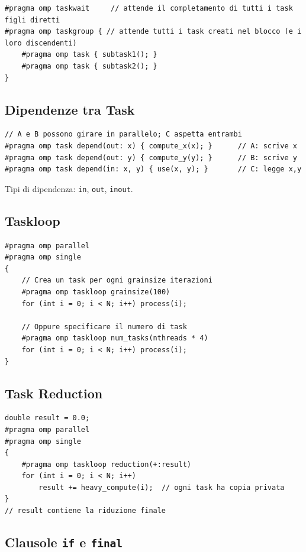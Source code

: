 \documentclass[11pt,a4paper]{article}
\theoremstyle{remark}
\begin{document}
\begin{lstlisting}[style=cpp]
#pragma omp taskwait     // attende il completamento di tutti i task figli diretti
#pragma omp taskgroup { // attende tutti i task creati nel blocco (e i loro discendenti)
    #pragma omp task { subtask1(); }
    #pragma omp task { subtask2(); }
}
\end{lstlisting}

\subsection{Dipendenze tra Task}

\begin{lstlisting}[style=cpp]
// A e B possono girare in parallelo; C aspetta entrambi
#pragma omp task depend(out: x) { compute_x(x); }      // A: scrive x
#pragma omp task depend(out: y) { compute_y(y); }      // B: scrive y
#pragma omp task depend(in: x, y) { use(x, y); }       // C: legge x,y
\end{lstlisting}

Tipi di dipendenza: \lstinline|in|, \lstinline|out|, \lstinline|inout|.

\subsection{Taskloop}

\begin{lstlisting}[style=cpp]
#pragma omp parallel
#pragma omp single
{
    // Crea un task per ogni grainsize iterazioni
    #pragma omp taskloop grainsize(100)
    for (int i = 0; i < N; i++) process(i);

    // Oppure specificare il numero di task
    #pragma omp taskloop num_tasks(nthreads * 4)
    for (int i = 0; i < N; i++) process(i);
}
\end{lstlisting}

\subsection{Task Reduction}

\begin{lstlisting}[style=cpp]
double result = 0.0;
#pragma omp parallel
#pragma omp single
{
    #pragma omp taskloop reduction(+:result)
    for (int i = 0; i < N; i++)
        result += heavy_compute(i);  // ogni task ha copia privata
}
// result contiene la riduzione finale
\end{lstlisting}

\subsection{Clausole \texttt{if} e \texttt{final}}
\end{document}
